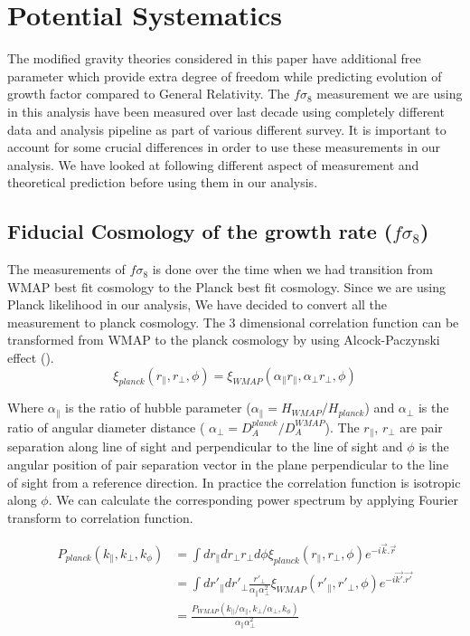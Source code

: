 
\section{Potential Systematics} 
The modified gravity theories considered in this paper have additional free parameter which provide extra degree of freedom while predicting  evolution of growth factor compared to General Relativity. The $f\sigma_8$ measurement we are using in this analysis have been measured over last decade using completely different data and analysis pipeline as part of various different survey. It is important to account for some crucial differences in order to use these measurements in our analysis. We have looked at following different aspect of measurement and theoretical prediction before using them in our analysis.

\subsection{Fiducial Cosmology of the growth rate ($f\sigma_8$)}
\label{sec:fidcosmo}
The measurements of $f\sigma_8$ is done over the time when we had transition from WMAP best fit cosmology to the Planck  best fit cosmology. Since we are using Planck likelihood in our analysis, We have decided to convert all the measurement to planck cosmology.
The 3 dimensional correlation function can be transformed from WMAP to the planck cosmology by using Alcock-Paczynski effect (\citet{AP79}).
\begin{equation}
\xi_{planck}(r_\parallel ,r_\perp,\phi) =\xi_{WMAP}(\alpha_\parallel r_\parallel ,\alpha_\perp r_\perp,\phi)
\end{equation}

Where $\alpha_\parallel$ is the ratio of hubble parameter ($\alpha_\parallel=H_{WMAP}/H_{planck} $) and $\alpha_\perp$ is the ratio of angular diameter distance ( $\alpha_\perp=D_A^{planck}/D_A^{WMAP}$). The $r_\parallel$, $r_\perp$ are pair separation along line of sight and perpendicular to the line of sight and $\phi$ is the angular position of pair separation vector in the plane perpendicular to the line of sight from a reference direction. In practice the correlation function is isotropic along $\phi$.
We can calculate the corresponding power spectrum by applying Fourier transform to correlation function.

\begin{align}
P_{planck}(k_\parallel,k_\perp,k_\phi) &= \int dr_\parallel dr_\perp r_\perp d\phi \xi_{planck}(r_\parallel ,r_\perp,\phi) e^{-i\vec{k}.\vec{r}} \\
     &= \int dr'_\parallel dr'_\perp \frac{r'_\perp}{\alpha_\parallel \alpha_\perp^2} \xi_{WMAP}(r'_\parallel ,r'_\perp,\phi) e^{-i\vec{k'}.\vec{r'}} \\
     &= \frac{P_{WMAP}(k_\parallel/\alpha_\parallel ,k_\perp/ \alpha_\perp,k_\phi)}{\alpha_\parallel \alpha_\perp^2}
\end{align}

